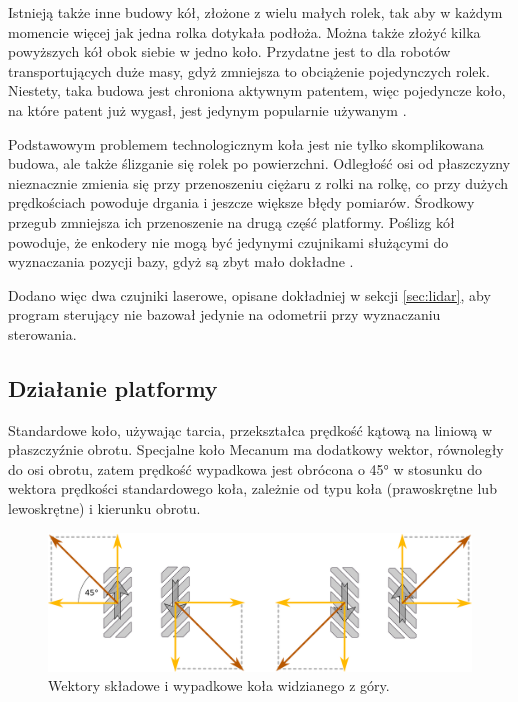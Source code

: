 	Istnieją także inne budowy kół, złożone z wielu małych rolek, tak aby w każdym momencie więcej jak jedna rolka dotykała podłoża.
	Można także złożyć kilka powyższych kół obok siebie w jedno koło.
	Przydatne jest to dla robotów transportujących duże masy, gdyż zmniejsza to obciążenie pojedynczych rolek.
	Niestety, taka budowa jest chroniona aktywnym patentem, więc pojedyncze koło, na które patent już wygasł, jest jedynym popularnie używanym \cite{paletobot}.

	Podstawowym problemem technologicznym koła jest nie tylko skomplikowana budowa, ale także ślizganie się rolek po powierzchni.
	Odległość osi od płaszczyzny nieznacznie zmienia się przy przenoszeniu ciężaru z rolki na rolkę, co przy dużych prędkościach powoduje drgania i jeszcze większe błędy pomiarów.
	Środkowy przegub zmniejsza ich przenoszenie na drugą część platformy.
	Poślizg kół powoduje, że enkodery nie mogą być jedynymi czujnikami służącymi do wyznaczania pozycji bazy, gdyż są zbyt mało dokładne \cite{heavy}.
	
	Dodano więc dwa czujniki laserowe, opisane dokładniej w sekcji \ref{sec:lidar}, aby program sterujący nie bazował jedynie na odometrii przy 
	wyznaczaniu sterowania.

	\subsection{Działanie platformy}
	Standardowe koło, używając tarcia, przekształca prędkość kątową na liniową w płaszczyźnie obrotu. 
	Specjalne koło Mecanum ma dodatkowy wektor, równoległy do osi obrotu, 
	zatem prędkość wypadkowa jest obrócona o 45° w stosunku do wektora prędkości standardowego koła, 
	zależnie od typu koła (prawoskrętne lub lewoskrętne) i kierunku obrotu.

	\begin{figure}[H]
	\centering
	\includegraphics[width=\textwidth]{graphics/vectors.pdf}
	\caption{Wektory składowe i wypadkowe koła widzianego z góry.}
	\label{fig:wheel_vectors}
	\end{figure} 

